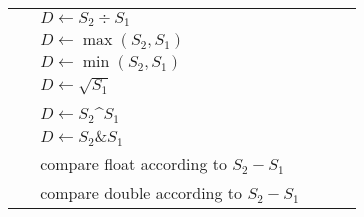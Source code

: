 \begin{center}
\begin{supertabular}{>{\tt}m{80pt}C{36pt}C{17pt}C{17pt}m{160pt}}
 & $D\leftarrow S_2\div S_1$\\
 & $D\leftarrow\max(S_2, S_1)$\\
 & $D\leftarrow\min(S_2, S_1)$\\
 & $D\leftarrow\sqrt{S_1}$\\\midrule
{} & $D\leftarrow S_2${\^{}}$S_1$\\
 & $D\leftarrow S_2\&S_1$\\\midrule
{} & compare float according to $S_2-S_1$\\
 & compare double according to $S_2-S_1$\\\bottomrule
\end{supertabular}
\end{center}
\ifx\PREAMBLE\undefined

\fi